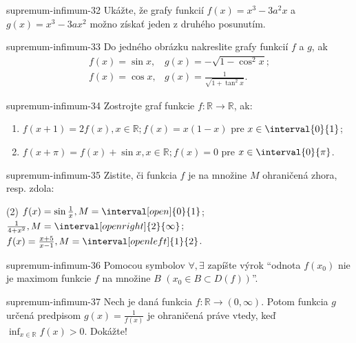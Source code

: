 \begin{defproblem}{supremum-infimum-32}
Ukážte, že grafy funkcií $f(x)=x^3-3a^2x$ a $g(x)=x^3-3ax^2$ možno získať jeden z druhého posunutím.
\end{defproblem}

\begin{defproblem}{supremum-infimum-33}
Do jedného obrázku nakreslite grafy funkcií $f$ a $g$, ak
\begin{align*}
f(x)=\sin x,& g(x)=-\sqrt{1-\cos^2 x};\\
f(x)=\cos x,& g(x)=\frac{1}{\sqrt{1+\tan^2 x}}.
\end{align*}
\end{defproblem}

\begin{defproblem}{supremum-infimum-34}
Zostrojte graf funkcie $f:\mathbb{R} \rightarrow \mathbb{R}$, ak:
\begin{enumerate}
  \item
    $f(x+1) = 2f(x), x \in \mathbb{R};
      f(x) = x(1-x)$ pre $x \in \interval{0}{1}
    $;
  \item
    $f(x+\pi)=f(x)+\sin{x}, x \in \mathbb{R};
      f(x) = 0$ pre $x \in \interval{0}{\pi}
    $.
\end{enumerate}
\end{defproblem}

\begin{defproblem}{supremum-infimum-35}
Zistite, či funkcia $f$ je na množine $M$ ohraničená zhora, resp. zdola:
\begin{tasks}(2)
  \task $f(x)=\sin\frac{1}{x},M=\interval[open]{0}{1}$;
  \task $\frac{1}{4+x^2},M=\interval[open right]{2}{\infty}$;
  \task $f(x)=\frac{x+5}{x-1},M=\interval[open left]{1}{2}$.
\end{tasks}
\end{defproblem}

\begin{defproblem}{supremum-infimum-36}
Pomocou symbolov $\forall,\exists$ zapíšte výrok ``odnota $f(x_0)$ nie je
maximom funkcie $f$ na množine $B$ $(x_0\in B\subset D(f))$''.
\end{defproblem}

\begin{defproblem}{supremum-infimum-37}
Nech je daná funkcia $f:\mathbb{R}\rightarrow(0,\infty)$. Potom funkcia $g$
určená predpisom $g(x)=\frac{1}{f(x)}$ je ohraničená práve vtedy, keď
$\inf_{x\in\mathbb{R}}f(x)>0$. Dokážte!
\end{defproblem}

